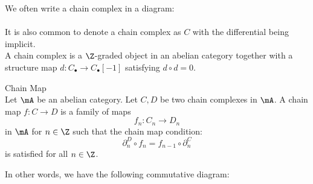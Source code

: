 \documentclass[a4paper]{article}
\begin{document}
We often write a chain complex in a diagram: \\
\\
It is also common to denote a chain complex as $C$ with the differential being implicit. \\

A chain complex is a $\Z$-graded object in an abelian category together with a structure map $d:C_\bullet\to C_\bullet[-1]$ satisfying $d\circ d=0$. 

\begin{defn}{Chain Map}{}\\
Let $\mA$ be an abelian category. Let $C,D$ be two chain complexes in $\mA$. A chain map $f:C\to D$ is a family of maps $$f_n:C_n\to D_n$$ in $\mA$ for $n\in\Z$ such that the chain map condition: $$\partial_n^D\circ f_n=f_{n-1}\circ\partial_n^C$$ is satisfied for all $n\in\Z$. 
\end{defn}

In other words, we have the following commutative diagram: \\
\end{document}
